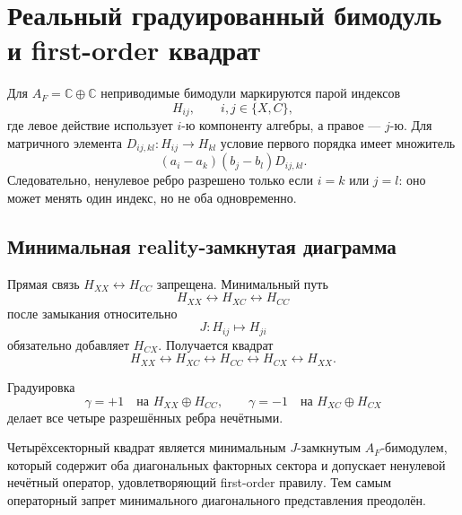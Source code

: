 \chapter{Реальный градуированный бимодуль и first-order квадрат}

Для \(A_F=\mathbb C\oplus\mathbb C\) неприводимые бимодули маркируются
парой индексов
\begin{equation}
 H_{ij},
 \qquad i,j\in\{X,C\},
\end{equation}
где левое действие использует \(i\)-ю компоненту алгебры, а правое ---
\(j\)-ю. Для матричного элемента
\(D_{ij,kl}:H_{ij}\to H_{kl}\) условие первого порядка имеет множитель
\begin{equation}
 (a_i-a_k)(b_j-b_l)D_{ij,kl}.
\end{equation}
Следовательно, ненулевое ребро разрешено только если \(i=k\) или \(j=l\):
оно может менять один индекс, но не оба одновременно.

\section{Минимальная reality-замкнутая диаграмма}

Прямая связь \(H_{XX}\leftrightarrow H_{CC}\) запрещена. Минимальный путь
\begin{equation}
 H_{XX}\longleftrightarrow H_{XC}
 \longleftrightarrow H_{CC}
\end{equation}
после замыкания относительно
\begin{equation}
 J:H_{ij}\longmapsto H_{ji}
\end{equation}
обязательно добавляет \(H_{CX}\). Получается квадрат
\begin{equation}
 H_{XX}\leftrightarrow H_{XC}\leftrightarrow H_{CC}
 \leftrightarrow H_{CX}\leftrightarrow H_{XX}.
\end{equation}

Градуировка
\begin{equation}
 \gamma=+1\quad\text{на }H_{XX}\oplus H_{CC},
 \qquad
 \gamma=-1\quad\text{на }H_{XC}\oplus H_{CX}
\end{equation}
делает все четыре разрешённых ребра нечётными.

\begin{theorem}
Четырёхсекторный квадрат является минимальным \(J\)-замкнутым
\(A_F\)-бимодулем, который содержит оба диагональных факторных сектора и
допускает ненулевой нечётный оператор, удовлетворяющий first-order
правилу. Тем самым операторный запрет минимального диагонального
представления преодолён.
\end{theorem}

